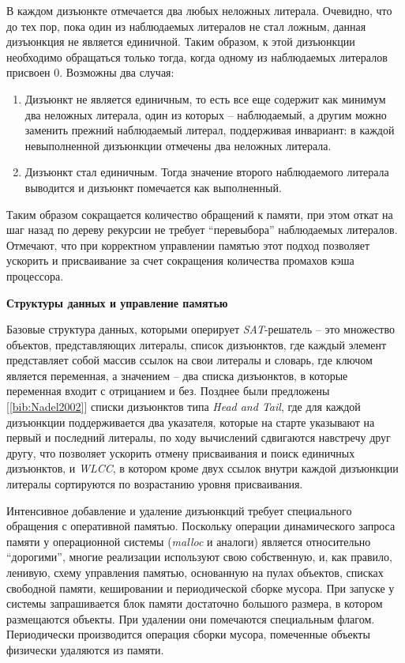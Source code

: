 В каждом дизъюнкте отмечается два любых неложных литерала. Очевидно, что до тех пор, пока один из наблюдаемых литералов не стал ложным, данная дизъюнкция не является единичной. Таким образом, к этой дизъюнкции необходимо обращаться только тогда, когда одному из наблюдаемых литералов присвоен $0$. Возможны два случая:

\begin{enumerate}

\item Дизъюнкт не является единичным, то есть все еще содержит как минимум два неложных литерала, один из которых -- наблюдаемый, а другим можно заменить прежний наблюдаемый литерал, поддерживая инвариант: в каждой невыполненной дизъюнкции отмечены два неложных литерала.

\item Дизъюнкт стал единичным. Тогда значение второго наблюдаемого литерала выводится и дизъюнкт помечается как выполненный.

\end{enumerate}

Таким образом сокращается количество обращений к памяти, при этом откат на шаг назад по дереву рекурсии не требует \enquote{перевыбора} наблюдаемых литералов. Отмечают, что при корректном управлении памятью этот подход позволяет ускорить и присваивание за счет сокращения количества промахов кэша процессора.

\textbf{Структуры данных и управление памятью}

Базовые структура данных, которыми оперирует \textit{SAT}-решатель -- это множество объектов, представляющих литералы, список дизъюнктов, где каждый элемент представляет собой массив ссылок на свои литералы и словарь, где ключом является переменная, а значением -- два списка дизъюнктов, в которые переменная входит с отрицанием и без. Позднее были предложены [\ref{bib:Nadel2002}] списки дизъюнктов типа \textit{Head and Tail}, где для каждой дизъюнкции поддерживается два указателя, которые на старте указывают на первый и последний литералы, по ходу вычислений сдвигаются навстречу друг другу, что позволяет ускорить отмену присваивания и поиск единичных дизъюнктов, и \textit{WLCC}, в котором кроме двух ссылок внутри каждой дизъюнкции литералы сортируются по возрастанию уровня присваивания.

Интенсивное добавление и удаление дизъюнкций требует специального обращения с оперативной памятью. Поскольку операции динамического запроса памяти у операционной системы (\textit{malloc} и аналоги) является относительно \enquote{дорогими}, многие реализации используют свою собственную, и, как правило, ленивую, схему управления памятью, основанную на пулах объектов, списках свободной памяти, кешировании и периодической сборке мусора. При запуске у системы запрашивается блок памяти достаточно большого размера, в котором размещаются объекты. При удалении они помечаются специальным флагом. Периодически производится операция сборки мусора, помеченные объекты физически удаляются из памяти.

